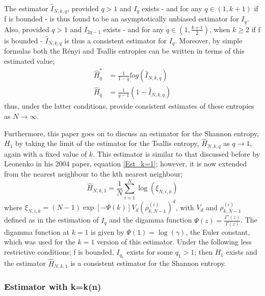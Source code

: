 \documentclass{article}
\begin{document}
The estimator $\hat{I}_{N, k, q}$, provided $q>1$ and $I_{q}$ exists - and for any $q \in (1, k+1)$ if f is bounded - is thus found to be an asymptotically unbiased estimator for $I_{q}$. Also, provided  $q>1$ and $I_{2q-1}$ exists -  and for any $q \in (1, \frac{k+1}{2})$, when $k \geq 2$ if f is bounded - $\hat{I}_{N, k, q}$ is thus a consistent estimator for $I_{q}$. Moreover, by simple formulas both the R\'enyi and Tsallis entropies can be written in terms of this estimated value; 
\begin{align}
\hat{H}_{q}^{*} &= \frac{1}{1-q} log(\hat{I}_{N, k, q}) \\
\hat{H}_{q} &= \frac{1}{q-1} (1 - \hat{I}_{N, k, q})
\end{align}
thus, under the latter conditions, provide consistent estimates of these entropies as $N \to \infty$.

Furthermore, this paper goes on to discuss an estimator for the Shannon entropy, $H_{1}$ by taking the limit of the estimator for the Tsallis entropy, $\hat{H}_{N, k, q}$ as $q \to 1$, again with a fixed value of $k$. This estimator is similar to that discussed before by Leonenko in his 2004 paper, equation \ref{Est_k=1}; however, it is now extended from the nearest neighbour to the kth nearest neighbour;
\begin{equation}
\hat{H}_{N, k, 1} =  \frac{1}{N} \sum_{i=1}^{N} \log (\xi_{N, i, k})
\end{equation} 
where $\xi_{N, i, k} = (N-1)\exp[-\Psi(k)]V_{d}(\rho_{k, N-1}^{(i)})^{d}$, with $V_{d}$ and $\rho_{k, N-1}^{(i)}$ defined as in the estimation of $I_{q}$ and the digamma function $\Psi(z) = \frac{\Gamma'(z)}{\Gamma(z)}$. The digamma function at $k=1$ is given by $\Psi(1) = \log(\gamma)$, the Euler constant, which was used for the $k=1$ version of this estimator. Under the following less restrictive conditions; f is bounded, $I_{q_{1}}$ exists for some $q_{1} > 1$; then $H_{1}$ exists and the estimator $\hat{H}_{N, k, 1}$ is a consistent estimator for the Shannon entropy.


\subsubsection{Estimator with k=k(n)}
\end{document}
